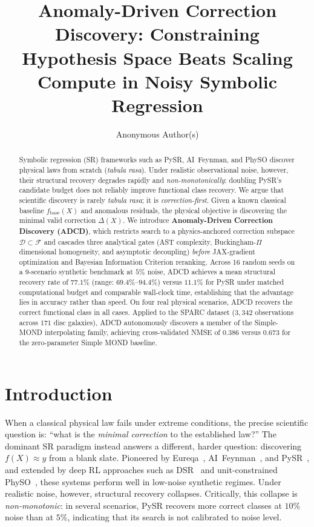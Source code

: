 \documentclass{article}
\title{Anomaly-Driven Correction Discovery: Constraining Hypothesis Space Beats Scaling Compute in Noisy Symbolic Regression}
\author{Anonymous Author(s)}
\begin{document}
\maketitle

\begin{abstract}
Symbolic regression (SR) frameworks such as PySR, AI~Feynman, and PhySO discover physical laws from scratch (\emph{tabula rasa}). Under realistic observational noise, however, their structural recovery degrades rapidly and \emph{non-monotonically}: doubling PySR's candidate budget does not reliably improve functional class recovery. We argue that scientific discovery is rarely \emph{tabula rasa}; it is \emph{correction-first}. Given a known classical baseline $f_{\text{base}}(X)$ and anomalous residuals, the physical objective is discovering the minimal valid correction $\Delta(X)$. We introduce \textbf{Anomaly-Driven Correction Discovery (ADCD)}, which restricts search to a physics-anchored correction subspace $\mathcal{D} \subset \mathcal{F}$ and cascades three analytical gates (AST complexity, Buckingham-$\Pi$ dimensional homogeneity, and asymptotic decoupling) \emph{before} JAX-gradient optimization and Bayesian Information Criterion reranking. Across 16 random seeds on a 9-scenario synthetic benchmark at $5\%$ noise, ADCD achieves a mean structural recovery rate of $77.1\%$ (range: $69.4\%$--$94.4\%$) versus $11.1\%$ for PySR under matched computational budget and comparable wall-clock time, establishing that the advantage lies in accuracy rather than speed. On four real physical scenarios, ADCD recovers the correct functional class in all cases. Applied to the SPARC dataset ($3{,}342$ observations across $171$ disc galaxies), ADCD autonomously discovers a member of the Simple-MOND interpolating family, achieving cross-validated NMSE of $0.386$ versus $0.673$ for the zero-parameter Simple MOND baseline.
\end{abstract}

\section{Introduction}
\label{sec:intro}

When a classical physical law fails under extreme conditions, the precise scientific question is: ``what is the \emph{minimal correction} to the established law?'' The dominant SR paradigm instead answers a different, harder question: discovering $f(X) \approx y$ from a blank slate. Pioneered by Eureqa~\cite{schmidt2009distilling}, AI~Feynman~\cite{udrescu2020ai}, and PySR~\cite{cranmer2023pysr}, and extended by deep RL approaches such as DSR~\cite{petersen2021deep} and unit-constrained PhySO~\cite{tenachi2023physo}, these systems perform well in low-noise synthetic regimes. Under realistic noise, however, structural recovery collapses. Critically, this collapse is \emph{non-monotonic}: in several scenarios, PySR recovers more correct classes at $10\%$ noise than at $5\%$, indicating that its search is not calibrated to noise level.
\end{document}
